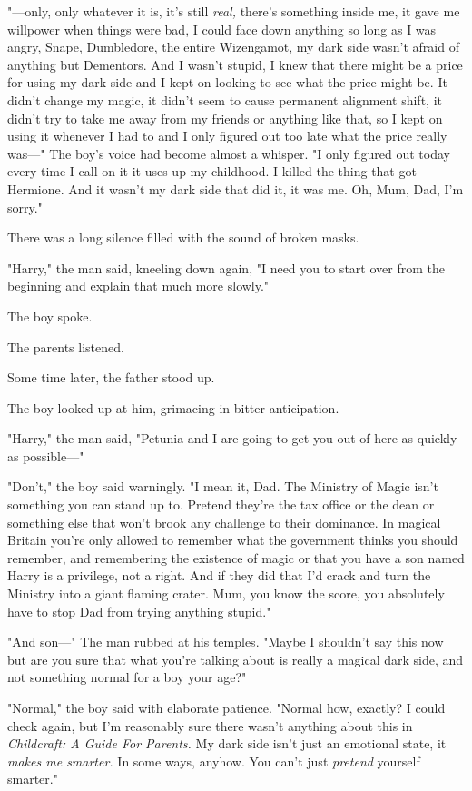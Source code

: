 "—only, only whatever it is, it's still \emph{real,} there's something inside
me, it gave me willpower when things were bad, I could face down anything so
long as I was angry, Snape, Dumbledore, the entire Wizengamot, my dark side
wasn't afraid of anything but Dementors. And I wasn't stupid, I knew that there
might be a price for using my dark side and I kept on looking to see what the
price might be. It didn't change my magic, it didn't seem to cause permanent
alignment shift, it didn't try to take me away from my friends or anything like
that, so I kept on using it whenever I had to and I only figured out too late
what the price really was—" The boy's voice had become almost a whisper. "I
only figured out today{\el} every time I call on it{\el} it uses up my
childhood. I killed the thing that got Hermione. And it wasn't my dark side
that did it, it was me. Oh, Mum, Dad, I'm sorry."

There was a long silence filled with the sound of broken masks.

"Harry," the man said, kneeling down again, "I need you to start over from the
beginning and explain that much more slowly."

The boy spoke.

The parents listened.

Some time later, the father stood up.

The boy looked up at him, grimacing in bitter anticipation.

"Harry," the man said, "Petunia and I are going to get you out of here as
quickly as possible—"

"Don't," the boy said warningly. "I mean it, Dad. The Ministry of Magic isn't
something you can stand up to. Pretend they're the tax office or the dean or
something else that won't brook any challenge to their dominance. In magical
Britain you're only allowed to remember what the government thinks you should
remember, and remembering the existence of magic or that you have a son named
Harry is a privilege, not a right. And if they did that I'd crack and turn the
Ministry into a giant flaming crater. Mum, you know the score, you absolutely
have to stop Dad from trying anything stupid."

"And son—" The man rubbed at his temples. "Maybe I shouldn't say this
now{\el} but are you sure that what you're talking about is really a magical
dark side, and not something normal for a boy your age?"

"Normal," the boy said with elaborate patience. "Normal how, exactly? I could
check again, but I'm reasonably sure there wasn't anything about this in
\emph{Childcraft: A Guide For Parents.} My dark side isn't just an emotional
state, it \emph{makes me smarter.} In some ways, anyhow. You can't just
\emph{pretend} yourself smarter."

